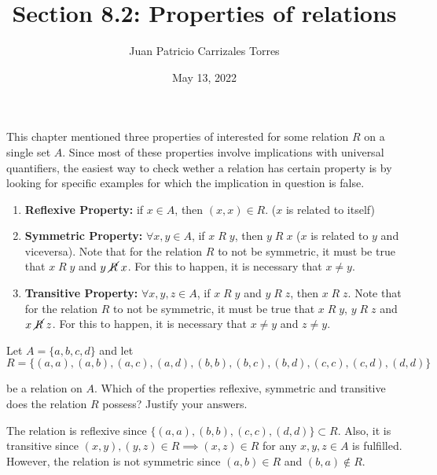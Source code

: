 \documentclass[12pt]{article}
\newenvironment{problem}[2][Problem]{\begin{trivlist}
		\item[\hskip \labelsep {\bfseries #1}\hskip \labelsep {\bfseries #2.}]}{\end{trivlist}}
\newenvironment{solution}[2][Solution]{\begin{trivlist}
		\item[\hskip \labelsep {\bfseries #1}\hskip \labelsep {\bfseries #2.}]}{\end{trivlist}}
\begin{document}
 
	
	\title{Section 8.2: Properties of relations}
	\author{Juan Patricio Carrizales Torres}
	\date{May 13, 2022}
	\maketitle

	This chapter mentioned three properties of interested for some relation $R$ on a single set $A$. Since most of these properties involve implications with universal quantifiers, the easiest way to check wether a relation has certain property is by looking for specific examples for which the implication in question is false.
	\begin{enumerate}[label=(\alph*)]
		\item \textbf{Reflexive Property:} if $x\in A$, then $(x,x)\in R$. ($x$ is related to itself)
		\item \textbf{Symmetric Property:} $\forall x,y\in A$, if $x\; R \; y$, then $y\; R \; x$ ($x$ is related to $y$ and viceversa). Note that for the relation $R$ to not be symmetric, it must be true that $x \; R \; y$ and $y \; \cancel R \; x$. For this to happen, it is necessary that $x\neq y$. 
		\item \textbf{Transitive Property:} $\forall x,y,z\in A$, if $x\; R \; y$ and  $y \; R \; z$, then $x\; R \;z$. Note that for the relation $R$ to not be symmetric, it must be true that $x \; R \; y$, $y \; R \; z$ and $x \; \cancel R \; z$. For this to happen, it is necessary that $x\neq y$ and $z\neq y$.
	\end{enumerate} 
 
 	\begin{problem}{11}
 		Let $A=\{a,b,c,d\}$ and let 	
 		\begin{equation*}
 			R=\{(a,a),(a,b),(a,c),(a,d),(b,b),(b,c),(b,d),(c,c),(c,d),(d,d)\}
 		\end{equation*}
 		
 		be a relation on $A$. Which of the properties reflexive, symmetric and transitive does the relation $R$ possess? Justify your answers.
 		\begin{solution}{11}
 			The relation is reflexive since $\{(a,a),(b,b),(c,c),(d,d)\}\subset R$. Also, it is transitive since $(x,y),(y,z)\in R \implies (x,z)\in R$ for any $x,y,z\in A$ is fulfilled. However, the relation is not symmetric since $(a,b)\in R$ and $(b,a)\not\in R$.
 		\end{solution}
 	\end{problem}
 
\end{document}
